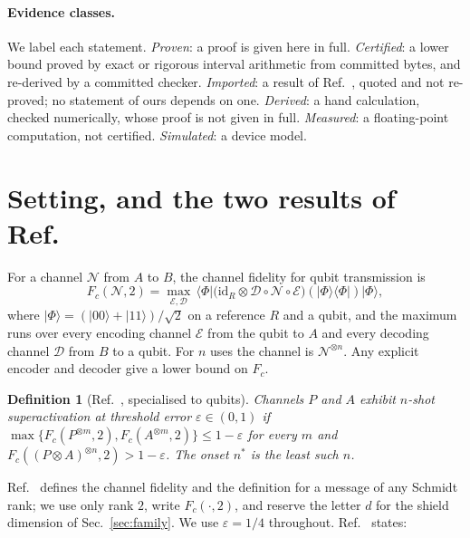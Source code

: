 \documentclass[aps,pra,twocolumn,superscriptaddress,nofootinbib,longbibliography,floatfix]{revtex4-2}
\newtheorem{definition}[theorem]{Definition}
\newcommand{\ket}[1]{|#1\rangle}
\newcommand{\bra}[1]{\langle #1|}
\newcommand{\proj}[1]{|#1\rangle\langle #1|}
\newcommand{\mes}{\varPhi}
\newcommand{\id}{\mathrm{id}}
\begin{document}
\begin{table}[tbp]
\caption{The results and their evidence classes. The proofs use standard results we cite: the fidelity bounds for PPT states~\cite{horodecki1999general} and for two-extendible states~\cite{johnson2013compatible,kaur2019extendibility}, and data processing. At $d=2$ the proven rows on the family are Prop.~1 and Result~1 of Ref.~\cite{parentin2026onset}.}
\label{tab:claims}
\small

\end{table}

\paragraph*{Evidence classes.} We label each statement. \emph{Proven}: a proof is given here in full. \emph{Certified}: a lower bound proved by exact or rigorous interval arithmetic from committed bytes, and re-derived by a committed checker. \emph{Imported}: a result of Ref.~\cite{parentin2026onset}, quoted and not re-proved; no statement of ours depends on one. \emph{Derived}: a hand calculation, checked numerically, whose proof is not given in full. \emph{Measured}: a floating-point computation, not certified. \emph{Simulated}: a device model.

\section{Setting, and the two results of Ref.~\cite{parentin2026onset}}
\label{sec:setting}

For a channel $\mathcal N$ from $A$ to $B$, the channel fidelity for qubit transmission is
\begin{equation}
F_c(\mathcal N,2)=\max_{\mathcal E,\mathcal D}\,\bra{\mes}\bigl(\id_R\otimes\mathcal D\circ\mathcal N\circ\mathcal E\bigr)(\proj{\mes})\ket{\mes},
\end{equation}
where $\ket{\mes}=(\ket{00}+\ket{11})/\sqrt2$ on a reference $R$ and a qubit, and the maximum runs over every encoding channel $\mathcal E$ from the qubit to $A$ and every decoding channel $\mathcal D$ from $B$ to a qubit. For $n$ uses the channel is $\mathcal N^{\otimes n}$. Any explicit encoder and decoder give a lower bound on $F_c$.

\begin{definition}[Ref.~\cite{parentin2026onset}, specialised to qubits]
\label{def:nshot}
Channels $P$ and $A$ exhibit $n$-shot superactivation at threshold error $\varepsilon\in(0,1)$ if
$\max\{F_c(P^{\otimes m},2),F_c(A^{\otimes m},2)\}\le1-\varepsilon$ for every $m$ and $F_c((P\otimes A)^{\otimes n},2)>1-\varepsilon$. The onset $n^*$ is the least such $n$.
\end{definition}
Ref.~\cite{parentin2026onset} defines the channel fidelity and the definition for a message of any Schmidt rank; we use only rank $2$, write $F_c(\cdot,2)$, and reserve the letter $d$ for the shield dimension of Sec.~\ref{sec:family}. We use $\varepsilon=1/4$ throughout. Ref.~\cite{parentin2026onset} states:
\end{document}
